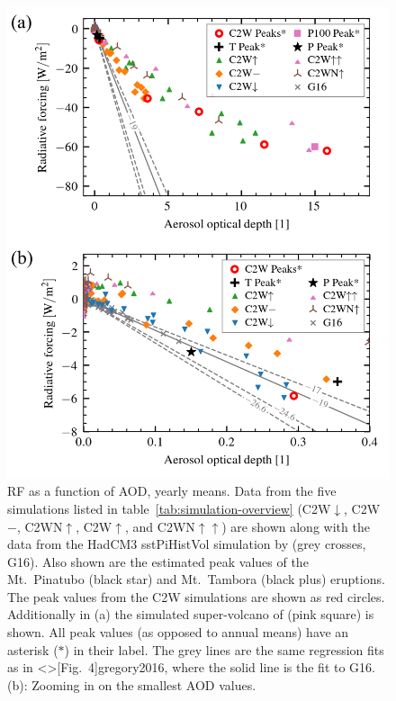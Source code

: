 \documentclass[draft]{agujournal2019}
\newcommand{\cw}{C2W}
\newcommand{\cwm}{C2W\(\downarrow\)}
\newcommand{\cwmp}{C2W\(-\)}
\newcommand{\cws}{C2WN\(\uparrow\)}
\newcommand{\cwss}{C2WN\(\uparrow\uparrow\)}
\newcommand{\cwsn}{C2W\(\uparrow\)}
\begin{document}
\begin{figure}
  \centering
  \includegraphics{figures/figure2.png}

  \caption{RF as a function of AOD, yearly means. Data from the five simulations listed in
    table~\ref{tab:simulation-overview} (\cwm{}, \cwmp{}, \cws{}, \cwsn{}, and \cwss{}) are
    shown along with the data from the HadCM3 sstPiHistVol simulation by 
    (grey crosses, G16). Also shown are the estimated peak values of the Mt.\ Pinatubo
    (black star) and Mt.\ Tambora (black plus) eruptions. The peak values from the \cw{}
    simulations are shown as red circles. Additionally in (a) the simulated super-volcano of
     (pink square) is shown. All peak values (as opposed to annual means)
    have an asterisk (\(\ast{}\)) in their label. The grey lines are the same regression
    fits as in \citeA<>[Fig.\ 4]{gregory2016}, where the solid line is the fit to G16. (b):
    Zooming in on the smallest AOD values.}\label{fig:2_rf_vs_aod_slopes}%
\end{figure}
\end{document}
